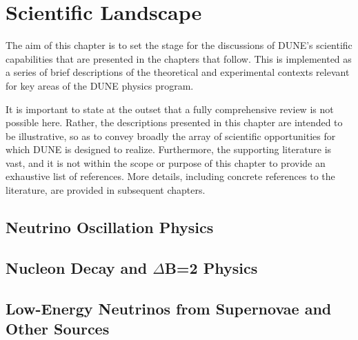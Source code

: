 \chapter{Scientific Landscape}
\label{ch:physics-landscape}

The aim of this chapter is to set the stage for the discussions of 
DUNE's scientific capabilities that are presented in the chapters 
that follow.  This is implemented as a series of brief 
descriptions of the theoretical and experimental contexts relevant 
for key areas of the DUNE physics program. 

It is important to state at the outset that a fully comprehensive 
review is not possible here.  Rather, the descriptions presented 
in this chapter are intended to be illustrative, so as to 
convey broadly the array of scientific opportunities for which 
DUNE is designed to realize.
Furthermore, the supporting literature is vast, and it is 
not within the scope or purpose of this chapter to provide an 
exhaustive list of references. 
More details, including concrete references to the literature, 
are provided in subsequent chapters.

\section{Neutrino Oscillation Physics}
\label{sec:landscape-osc}



\section{Nucleon Decay and $\Delta$B=2 Physics}
\label{sec:landscape-ndk}



%
\section{Low-Energy Neutrinos from Supernovae and Other Sources}
\label{sec:landscape-snb}


